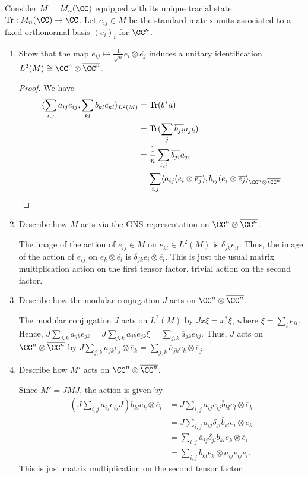 \documentclass{article}
\begin{document}
 Consider $M = M_n(\CC)$ equipped with its unique tracial state $\tr : M_n(\CC) \to \CC$. Let $e_{ij} \in M$ be
the standard matrix units associated to a fixed orthonormal basis $(e_i)_i$ for $\CC^n$.
\begin{enumerate}
\item Show that the map $e_{ij} \mapsto \frac{1}{\sqrt{n}} e_i \otimes \overline{e_j}$ induces a unitary identification
  $L^2(M) \cong \CC^n \otimes \overline{\CC^n}$.
  \begin{proof}
    We have
    \begin{align*}
      \langle \sum_{i,j} a_{ij} e_{ij}, \sum_{kl} b_{kl} e_{kl} \rangle_{L^2(M)} & = \tr(b^* a) \\
      & = \tr(\sum_j \overline{b_{ji}} a_{jk}) \\
      & = \frac 1 n \sum_{i,j} \overline{b_{ji}} a_{ji} \\
      & = \sum_{i,j} \langle a_{ij} (e_i \otimes \overline{e_j}),  b_{ij} (e_i \otimes \overline{e_j} \rangle_{\CC^n \otimes \overline{\CC^n}} \\
    \end{align*}
  \end{proof}
\item Describe how $M$ acts via the GNS representation on $\CC^n \otimes \overline{\CC^n}$.
  
  The image of the action of $e_{ij} \in M$ on $e_{kl} \in L^2(M)$ is $\delta_{jk} e_{il}$.  Thus,
  the image of the action of $e_{ij}$ on $e_k \otimes \overline{e_l}$ is $\delta_{jk} e_i \otimes \overline{e_l}$.
  This is just the usual matrix multiplication action on the first tensor factor, trivial action on the second factor.
    
\item Describe how the modular conjugation $J$ acts on $\CC^n \otimes \overline{\CC^n}$.
  
  The modular conjugation $J$ acts on $L^2(M)$ by $Jx \xi = x^* \xi$, where $\xi = \sum_i e_{ii}$.  Hence,
  $J \sum_{j,k} a_{jk} e_{jk} = J \sum_{j,k} a_{jk} e_{jk} \xi = \sum_{j,k} \overline a_{jk} e_{kj}$.  Thus, $J$
  acts on $\CC^n \otimes \overline{\CC^n}$ by $J \sum_{j,k} a_{jk} e_j \otimes \overline e_k = \sum_{j,k}
  \overline a_{jk} e_k \otimes \overline e_j$.
  
\item Describe how $M'$ acts on $\CC^n \otimes \overline{\CC^n}$.
  
    Since $M' = JMJ$, the action is given by
    \begin{align*}
      (J \sum_{i,j} a_{ij} e_{ij} J) b_{kl} e_k \otimes \overline e_l & = J \sum_{i,j} a_{ij} e_{ij} \overline b_{kl} e_l \otimes \overline e_k \\
      & = J \sum_{i,j} a_{ij} \delta_{jl} \overline b_{kl} e_i \otimes \overline e_k \\
      & = \sum_{i,j} \overline a_{ij} \delta_{jl} b_{kl} e_k \otimes \overline e_i \\
      & = \sum_{i,j}  b_{kl} e_k \otimes \overline a_{ij} e_{ij} \overline e_l.
    \end{align*}
    This is just matrix multiplication on the second tensor factor.
\end{enumerate}
\end{document}
